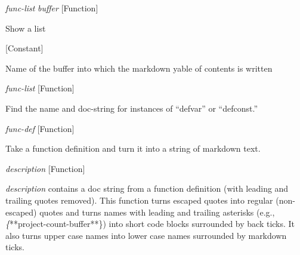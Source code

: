 \vspace{1em}
\noindent
{}
\usebox{\funcname}\emph{func-list} \emph{buffer}
 \hfill [Function]

\begin{doc-string}
Show a list
\end{doc-string}

\vspace{1em}
\noindent
{}
\usebox{\funcname}
 \hfill [Constant]

\begin{doc-string}
Name of the buffer into which the markdown yable of contents is written
\end{doc-string}

\vspace{1em}
\noindent
{}
\usebox{\funcname}\emph{func-list}
 \hfill [Function]

\begin{doc-string}
Find the name and doc-string for instances of ``defvar'' or ``defconst.''
\end{doc-string}

\vspace{1em}
\noindent
{}
\usebox{\funcname}\emph{func-def}
 \hfill [Function]

\begin{doc-string}
Take a function definition and turn it into a string of markdown text.
\end{doc-string}

\vspace{1em}
\noindent
{}
\usebox{\funcname}\emph{description}
 \hfill [Function]

\begin{doc-string}
\emph{description} contains a doc string from a function definition (with leading
and trailing quotes removed).  This function turns escaped quotes into regular
(non-escaped) quotes and turns names with leading and trailing asterisks (e.g.,
\emph\{**project-count-buffer**\}) into short code blocks surrounded by back ticks.  It also
turns upper case names into lower case names surrounded by markdown ticks.
\end{doc-string}

